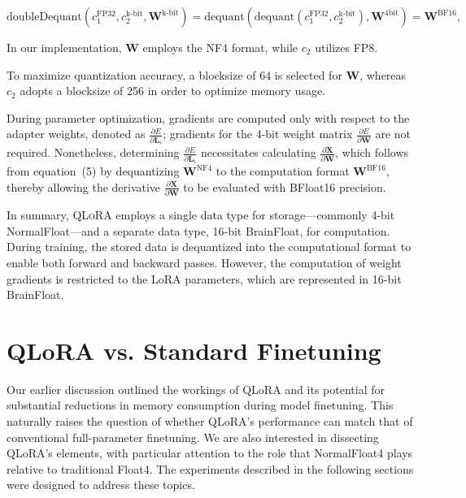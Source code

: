 \begin{equation}
    \text{doubleDequant}(c_1^{\text{FP32}}, c_2^{\text{k-bit}}, \mathbf{W}^{\text{k-bit}}) = \text{dequant}(\text{dequant}(c_1^{\text{FP32}}, c_2^{\text{k-bit}}), \mathbf{W}^{\text{4bit}}) = \mathbf{W}^{\text{BF16}},
\end{equation}

In our implementation, $\mathbf{W}$ employs the NF4 format, while $c_2$ utilizes FP8.

To maximize quantization accuracy, a blocksize of 64 is selected for $\mathbf{W}$, whereas $c_2$ adopts a blocksize of 256 in order to optimize memory usage.

During parameter optimization, gradients are computed only with respect to the adapter weights, denoted as $\frac{\partial E}{\partial \mathbf{L}_i}$; gradients for the 4-bit weight matrix $\frac{\partial E}{\partial \mathbf{W}}$ are not required. Nonetheless, determining $\frac{\partial E}{\partial \mathbf{L}_i}$ necessitates calculating $\frac{\partial \mathbf{X}}{\partial \mathbf{W}}$, which follows from equation~(5) by dequantizing $\mathbf{W}^{\text{NF4}}$ to the computation format $\mathbf{W}^{\text{BF16}}$, thereby allowing the derivative $\frac{\partial \mathbf{X}}{\partial \mathbf{W}}$ to be evaluated with BFloat16 precision.

In summary, \textsc{QLoRA} employs a single data type for storage—commonly 4-bit NormalFloat—and a separate data type, 16-bit BrainFloat, for computation. During training, the stored data is dequantized into the computational format to enable both forward and backward passes. However, the computation of weight gradients is restricted to the LoRA parameters, which are represented in 16-bit BrainFloat.

\section{QLoRA vs. Standard Finetuning}
\label{sec:comp_to_std}

Our earlier discussion outlined the workings of QLoRA and its potential for substantial reductions in memory consumption during model finetuning. This naturally raises the question of whether QLoRA’s performance can match that of conventional full-parameter finetuning. We are also interested in dissecting QLoRA’s elements, with particular attention to the role that NormalFloat4 plays relative to traditional Float4. The experiments described in the following sections were designed to address these topics.

